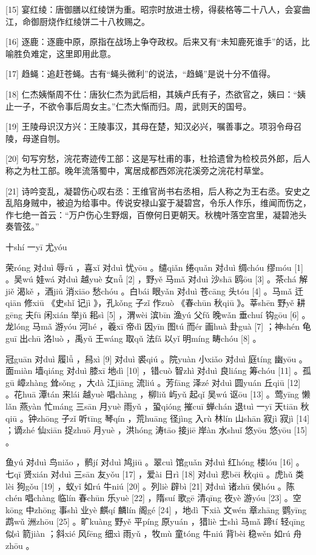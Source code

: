 \documentclass[12pt,UTF8]{ctexbook}
\begin{document}
[15] 宴红绫：唐御膳以红绫饼为重。昭宗时放进士榜，得裴格等二十八人，会宴曲江，命御厨烧作红绫饼二十八枚赐之。

[16] 逐鹿：逐鹿中原，原指在战场上争夺政权。后来又有“未知鹿死谁手”的话，比喻胜负难定，这里即用此意。

[17] 趋蝇：追赶苍蝇。古有“蝇头微利”的说法，“趋蝇”是说十分不值得。

[18] 仁杰姨惭周不仕：唐狄仁杰为武后相，其姨卢氏有子，杰欲官之，姨曰：“姨止一子，不欲令事后周女主。”仁杰大惭而归。周，武则天的国号。

[19] 王陵母识汉方兴：王陵事汉，其母在楚，知汉必兴，嘱善事之。项羽令母召陵，母遂自刎。

[20] 句写穷愁，浣花寄迹传工部：这是写杜甫的事，杜拾遗曾为检校员外郎，后人称之为杜工部。晚年流落蜀中，寓居成都西郊浣花溪旁之浣花村草堂。

[21] 诗吟变乱，凝碧伤心叹右丞：王维官尚书右丞相，后人称之为王右丞。安史之乱陷身贼中，被迫为给事中。传说安禄山宴于凝碧宫，令乐人作乐，维闻而伤之，作七绝一首云：“万户伤心生野烟，百僚何日更朝天。秋槐叶落空宫里，凝碧池头奏管弦。”





十shí 一yī 尤yóu


荣róng 对duì 辱rǔ ，喜xǐ 对duì 忧yōu 。缱qiǎn 绻quǎn 对duì 绸chóu 缪móu [1] 。吴wú 娃wá 对duì 越yuè 女nǚ [2] ，野yě 马mǎ 对duì 沙shā 鸥ōu [3] 。茶chá 解jiě 渴kě ，酒jiǔ 消xiāo 愁chóu 。白bái 眼yǎn 对duì 苍cāng 头tóu [4] 。马mǎ 迁qiān 修xiū 《史shǐ 记jì 》，孔kǒng 子zǐ 作zuò 《春chūn 秋qiū 》。莘shēn 野yě 耕gēng 夫fū 闲xián 举jǔ 耜sì [5] ，渭wèi 滨bīn 渔yú 父fǔ 晚wǎn 垂chuí 钩gōu [6] 。龙lóng 马mǎ 游yóu 河hé ，羲xī 帝dì 因yīn 图tú 而ér 画huà 卦guà [7] ；神shén 龟guī 出chū 洛luò ，禹yǔ 王wáng 取qǔ 法fǎ 以yǐ 明míng 畴chóu [8] 。

冠guān 对duì 履lǚ ，舄xì [9] 对duì 裘qiú 。院yuàn 小xiǎo 对duì 庭tíng 幽yōu 。面miàn 墙qiáng 对duì 膝xī 地dì [10] ，错cuò 智zhì 对duì 良liáng 筹chóu [11] 。孤gū 嶂zhàng 耸sǒng ，大dà 江jiāng 流liú 。芳fāng 泽zé 对duì 圆yuán 丘qiū [12] 。花huā 潭tán 来lái 越yuè 唱chàng ，柳liǔ 屿yǔ 起qǐ 吴wú 讴ōu [13] 。莺yīng 懒lǎn 燕yàn 忙máng 三sān 月yuè 雨yǔ ，蛩qióng 摧cuī 蝉chán 退tuì 一yī 天tiān 秋qiū 。钟zhōng 子zǐ 听tīng 琴qín ，荒huāng 径jìng 入rù 林lín 山shān 寂jì 寂jì [14] ；谪zhé 仙xiān 捉zhuō 月yuè ，洪hóng 涛tāo 接jiē 岸àn 水shuǐ 悠yōu 悠yōu [15] 。

鱼yú 对duì 鸟niǎo ，鹡jí 对duì 鸠jiū 。翠cuì 馆guǎn 对duì 红hóng 楼lóu [16] 。七qī 贤xián 对duì 三sān 友yǒu [17] ，爱ài 日rì [18] 对duì 悲bēi 秋qiū 。虎hǔ 类lèi 狗gǒu [19] ，蚁yǐ 如rú 牛niú [20] 。列liè 辟bì [21] 对duì 诸zhū 侯hóu 。陈chén 唱chàng 临lín 春chūn 乐yuè [22] ，隋suí 歌gē 清qīng 夜yè 游yóu [23] 。空kōng 中zhōng 事shì 业yè 麒qí 麟lín 阁gé [24] ，地dì 下xià 文wén 章zhāng 鹦yīng 鹉wǔ 洲zhōu [25] 。旷kuàng 野yě 平píng 原yuán ，猎liè 士shì 马mǎ 蹄tí 轻qīng 似sì 箭jiàn ；斜xié 风fēng 细xì 雨yǔ ，牧mù 童tóng 牛niú 背bèi 稳wěn 如rú 舟zhōu 。
\end{document}
